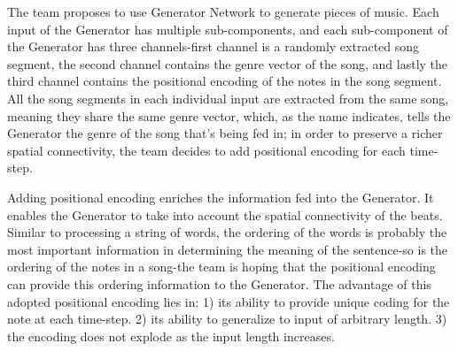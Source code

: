 \begin{par}
    \par The team proposes to use Generator Network to generate pieces of music. Each input of the Generator has 
    multiple sub-components, and each sub-component of the Generator has three channels-first channel is a randomly 
    extracted song segment, the second channel contains the genre vector of the song, and lastly the third channel contains the positional
    encoding of the notes in the song segment. All the song segments in each individual input are extracted from the same song, meaning
    they share the same genre vector, which, as the name indicates, tells the Generator the genre of the song that's being fed in; in order
    to preserve a richer spatial connectivity, the team decides to add positional encoding for each time-step. 
    
    Adding positional encoding enriches the information fed into the Generator. It enables the Generator to take into account the spatial 
    connectivity of the beats. Similar to processing a string of words, the ordering of the words is probably the most important information in
    determining the meaning of the sentence-so is the ordering of the notes in a song-the team is hoping that the positional encoding can provide
    this ordering information to the Generator. The advantage of this adopted positional encoding lies in: 1) its ability to provide unique coding
    for the note at each time-step. 2) its ability to generalize to input of arbitrary length. 3) the encoding does not explode as the input length
    increases. 

\end{par}